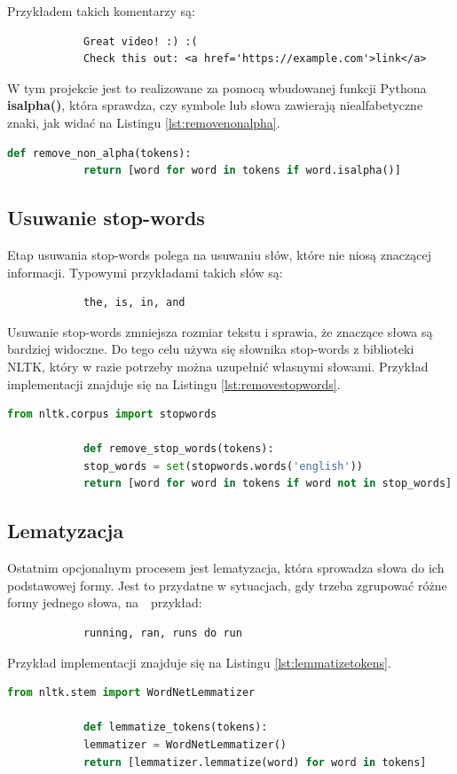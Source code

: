 		Przykładem takich komentarzy są:

		\begin{verbatim}
			Great video! :) :(
			Check this out: <a href='https://example.com'>link</a>
		\end{verbatim}
		W tym projekcie jest to realizowane za pomocą wbudowanej funkcji Pythona \textbf{isalpha()}, która sprawdza, czy symbole lub słowa zawierają niealfabetyczne znaki, jak widać na Listingu \ref{lst:removenonalpha}.
		
		\begin{lstlisting}[language=Python, caption={Funkcja usuwająca niealfabetyczne symbole}, label={lst:removenonalpha}]
			def remove_non_alpha(tokens):
			return [word for word in tokens if word.isalpha()]
		\end{lstlisting}
		
	\subsection{Usuwanie stop-words}
		Etap usuwania stop-words polega na usuwaniu słów, które nie niosą znaczącej informacji. Typowymi przykładami takich słów są:
		\begin{verbatim}
			the, is, in, and
		\end{verbatim}
		Usuwanie stop-words zmniejsza rozmiar tekstu i sprawia, że znaczące słowa są bardziej widoczne. Do tego celu używa się słownika stop-words z biblioteki NLTK, który w razie potrzeby można uzupełnić własnymi słowami. Przykład implementacji znajduje się na Listingu \ref{lst:removestopwords}.
		\begin{lstlisting}[language=Python, caption={Funkcja usuwająca stop-words}, label={lst:removestopwords}]
			from nltk.corpus import stopwords
			
			def remove_stop_words(tokens):
			stop_words = set(stopwords.words('english'))
			return [word for word in tokens if word not in stop_words]
		\end{lstlisting}

	\subsection{Lematyzacja}
		Ostatnim opcjonalnym procesem jest lematyzacja, która sprowadza słowa do ich podstawowej formy. Jest to przydatne w sytuacjach, gdy trzeba zgrupować różne formy jednego słowa, na~~przykład:
		\begin{verbatim}
			running, ran, runs do run
		\end{verbatim}
		Przykład implementacji znajduje się na Listingu \ref{lst:lemmatizetokens}.
		\begin{lstlisting}[language=Python, caption={Funkcja lematyzująca tokeny}, label={lst:lemmatizetokens}]
			from nltk.stem import WordNetLemmatizer
			
			def lemmatize_tokens(tokens):
			lemmatizer = WordNetLemmatizer()
			return [lemmatizer.lemmatize(word) for word in tokens]
		\end{lstlisting}

